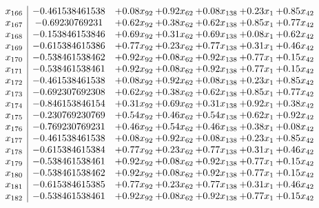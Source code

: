 \documentclass[8pt]{article}
\begin{document}
\[\begin{array}{c| c c@{\hskip 2pt} c@{\hskip 2pt} c@{\hskip 2pt} c@{\hskip 2pt} c@{\hskip 2pt} }
 x_{166}   &  -0.461538461538 & +  0.08 x_{92} & +  0.92 x_{62} & +  0.08 x_{138} & +  0.23 x_{1} & +  0.85 x_{42}\\
 x_{167}   &  -0.69230769231 & +  0.62 x_{92} & +  0.38 x_{62} & +  0.62 x_{138} & +  0.85 x_{1} & +  0.77 x_{42}\\
 x_{168}   &  -0.153846153846 & +  0.69 x_{92} & +  0.31 x_{62} & +  0.69 x_{138} & +  0.08 x_{1} & +  0.62 x_{42}\\
 x_{169}   &  -0.615384615386 & +  0.77 x_{92} & +  0.23 x_{62} & +  0.77 x_{138} & +  0.31 x_{1} & +  0.46 x_{42}\\
 x_{170}   &  -0.538461538462 & +  0.92 x_{92} & +  0.08 x_{62} & +  0.92 x_{138} & +  0.77 x_{1} & +  0.15 x_{42}\\
 x_{171}   &  -0.538461538461 & +  0.92 x_{92} & +  0.08 x_{62} & +  0.92 x_{138} & +  0.77 x_{1} & +  0.15 x_{42}\\
 x_{172}   &  -0.461538461538 & +  0.08 x_{92} & +  0.92 x_{62} & +  0.08 x_{138} & +  0.23 x_{1} & +  0.85 x_{42}\\
 x_{173}   &  -0.692307692308 & +  0.62 x_{92} & +  0.38 x_{62} & +  0.62 x_{138} & +  0.85 x_{1} & +  0.77 x_{42}\\
 x_{174}   &  -0.846153846154 & +  0.31 x_{92} & +  0.69 x_{62} & +  0.31 x_{138} & +  0.92 x_{1} & +  0.38 x_{42}\\
 x_{175}   &  -0.230769230769 & +  0.54 x_{92} & +  0.46 x_{62} & +  0.54 x_{138} & +  0.62 x_{1} & +  0.92 x_{42}\\
 x_{176}   &  -0.769230769231 & +  0.46 x_{92} & +  0.54 x_{62} & +  0.46 x_{138} & +  0.38 x_{1} & +  0.08 x_{42}\\
 x_{177}   &  -0.461538461538 & +  0.08 x_{92} & +  0.92 x_{62} & +  0.08 x_{138} & +  0.23 x_{1} & +  0.85 x_{42}\\
 x_{178}   &  -0.615384615384 & +  0.77 x_{92} & +  0.23 x_{62} & +  0.77 x_{138} & +  0.31 x_{1} & +  0.46 x_{42}\\
 x_{179}   &  -0.538461538461 & +  0.92 x_{92} & +  0.08 x_{62} & +  0.92 x_{138} & +  0.77 x_{1} & +  0.15 x_{42}\\
 x_{180}   &  -0.538461538462 & +  0.92 x_{92} & +  0.08 x_{62} & +  0.92 x_{138} & +  0.77 x_{1} & +  0.15 x_{42}\\
 x_{181}   &  -0.615384615385 & +  0.77 x_{92} & +  0.23 x_{62} & +  0.77 x_{138} & +  0.31 x_{1} & +  0.46 x_{42}\\
 x_{182}   &  -0.538461538461 & +  0.92 x_{92} & +  0.08 x_{62} & +  0.92 x_{138} & +  0.77 x_{1} & +  0.15 x_{42}\\

\end{array}\]
\end{document}
